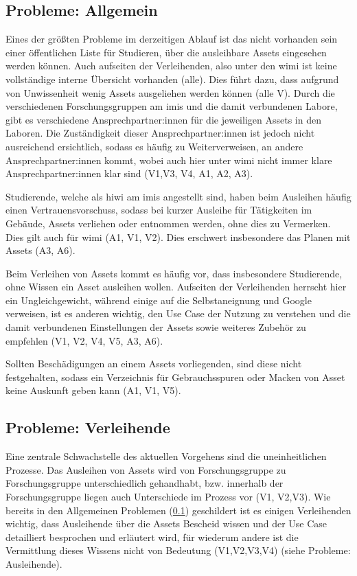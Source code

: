\subsection{Probleme: Allgemein}
\label{section:probleme-allgemein}
Eines der größten Probleme im derzeitigen Ablauf ist das nicht vorhanden sein einer öffentlichen
Liste für Studieren, über die ausleihbare Assets eingesehen werden können. Auch aufseiten der
Verleihenden, also unter den \ac{wimi} ist keine vollständige interne Übersicht vorhanden (alle).
Dies führt dazu, dass aufgrund von Unwissenheit wenig Assets ausgeliehen werden können (alle V). Durch
die verschiedenen Forschungsgruppen am \ac{imis} und die damit verbundenen Labore, gibt es
verschiedene Ansprechpartner:innen für die jeweiligen Assets in den Laboren. Die Zuständigkeit
dieser Ansprechpartner:innen ist jedoch nicht ausreichend ersichtlich, sodass es häufig zu
Weiterverweisen, an andere Ansprechpartner:innen kommt, wobei auch hier unter \ac{wimi} nicht immer
klare Ansprechpartner:innen klar sind (V1,V3, V4, A1, A2, A3).

Studierende, welche als \ac{hiwi} am \ac{imis} angestellt sind, haben beim Ausleihen häufig einen
Vertrauensvorschuss, sodass bei kurzer Ausleihe für Tätigkeiten im Gebäude, Assets verliehen oder
entnommen werden, ohne dies zu Vermerken. Dies gilt auch für \ac{wimi} (A1, V1, V2). Dies erschwert
insbesondere das Planen mit Assets (A3, A6).

Beim Verleihen von Assets kommt es häufig vor, dass insbesondere Studierende, ohne Wissen ein Asset
ausleihen wollen. Aufseiten der Verleihenden herrscht hier ein Ungleichgewicht, während einige auf
die Selbstaneignung und Google verweisen, ist es anderen wichtig, den Use Case der Nutzung zu
verstehen und die damit verbundenen Einstellungen der Assets sowie weiteres Zubehör zu empfehlen
(V1, V2, V4, V5, A3, A6).

Sollten Beschädigungen an einem Assets vorliegenden, sind diese nicht festgehalten, sodass ein
Verzeichnis für Gebrauchsspuren oder Macken von Asset keine Auskunft geben kann (A1, V1, V5).

\subsection{Probleme: Verleihende}
\label{section:probleme-verleihende}
Eine zentrale Schwachstelle des aktuellen Vorgehens sind die uneinheitlichen Prozesse. Das Ausleihen
von Assets wird von Forschungsgruppe zu Forschungsgruppe unterschiedlich gehandhabt, bzw. innerhalb
der Forschungsgruppe liegen auch Unterschiede im Prozess vor (V1, V2,V3). Wie bereits in den
Allgemeinen Problemen (\ref{section:probleme-allgemein}) geschildert ist es einigen Verleihenden
wichtig, dass Ausleihende über die Assets Bescheid wissen und der Use Case detailliert besprochen
und erläutert wird, für wiederum andere ist die Vermittlung dieses Wissens nicht von Bedeutung
(V1,V2,V3,V4) (siehe Probleme: Ausleihende).


